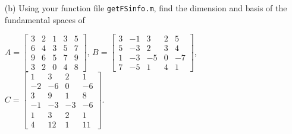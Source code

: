 \begin{exer}
\begin{enumerate}
\begin{verbatim}
  disp('Given matrix is:'); disp(A);
  fprintf('== Dimension of the fundamental spaces of given matrix == \n');
  fprintf('dim(row(A))=dim(col(A)): %d,', rank_A);
  fprintf('\t dim(null(A)): %d,\t dim(null(A_trans)): %d \n\n', nullity, nullity_T);
  fprintf('== Basis of the fundamental spaces of given matrix (in row vectors) == \n');
  disp(' row(A)'); disp(double(rowA_basis));
  disp(' col(A)'); disp(double(colA_basis));
  disp(' null(A)'); disp(nullA_basis);
  disp(' null(A_trans)'); disp(nullAtrans_basis);
  fprintf('\n*****************************************************\n');
end
\end{verbatim}
\endgroup
You may use the MATLAB commands \textit{rank, colspace, rref, null} and so on.
\vspace{3mm}
\item[(b)] Using your function file \verb"getFSinfo.m", find the dimension and basis of the fundamental spaces of

$A = \begin{bmatrix} 3 & 2& 1& 3& 5 \\ 6& 4& 3& 5& 7 \\ 9&6&5&7&9\\3&2&0&4&8 \end{bmatrix}$, $B = \begin{bmatrix} 3 & -1 & 3& 2& 5 \\ 5& -3&2&3&4\\ 1&-3&-5&0& -7\\ 7&-5&1&4&1\end{bmatrix}$, $C = \begin{bmatrix} 1& 3& 2& 1\\ -2 & -6 & 0& -6\\ 3& 9& 1& 8\\ -1& -3& -3& -6\\ 1& 3& 2& 1\\ 4& 12& 1&11 \end{bmatrix}$.
\end{enumerate}
\end{exer}

